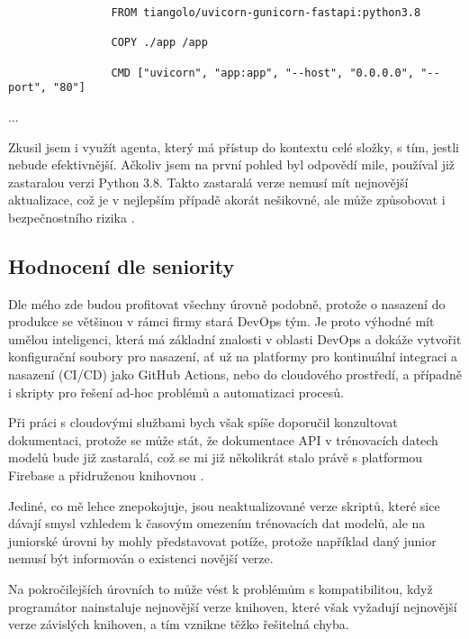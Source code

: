 \documentclass[FM,DP]{tulthesis}
\begin{document}
		\vspace{0.6em}
		\begin{tcolorbox}[colback=white,colframe=black,title=Soubor pro spuštení docker kontejneru]
			\begin{lstlisting}
				FROM tiangolo/uvicorn-gunicorn-fastapi:python3.8
				
				COPY ./app /app
				
				CMD ["uvicorn", "app:app", "--host", "0.0.0.0", "--port", "80"]
			\end{lstlisting}
			... \cite{agent_deploy}
		\end{tcolorbox}
		\vspace{0.6em}
		
		Zkusil jsem i využít agenta, který má přístup do kontextu celé složky, s tím, jestli nebude efektivnější. Ačkoliv jsem na první pohled byl odpovědí mile, používal již zastaralou verzi Python 3.8. Takto zastaralá verze nemusí mít nejnovější aktualizace, což je v nejlepším případě akorát nešikovné, ale může způsobovat i bezpečnostního rizika \cite{agent_deploy}.
		
		\subsection{Hodnocení dle seniority}
		Dle mého zde budou profitovat všechny úrovně podobně, protože o nasazení do produkce se většinou v rámci firmy stará DevOps tým. Je proto výhodné mít umělou inteligenci, která má základní znalosti v oblasti DevOps a dokáže vytvořit konfigurační soubory pro nasazení, ať už na platformy pro kontinuální integraci a nasazení (CI/CD) jako GitHub Actions, nebo do cloudového prostředí, a případně i skripty pro řešení ad-hoc problémů a automatizaci procesů. 
		
		Při práci s cloudovými službami bych však spíše doporučil konzultovat dokumentaci, protože se může stát, že dokumentace API v trénovacích datech modelů bude již zastaralá, což se mi již několikrát stalo právě s platformou Firebase a přidruženou knihovnou \cite{firebase} \cite{cicd} \cite{cicd2}.
		
		Jediné, co mě lehce znepokojuje, jsou neaktualizované verze skriptů, které sice dávají smysl vzhledem k časovým omezením trénovacích dat modelů, ale na juniorské úrovni by mohly představovat potíže, protože například daný junior nemusí být informován o existenci novější verze. 
		
		Na pokročilejších úrovních to může vést k problémům s kompatibilitou, když programátor nainstaluje nejnovější verze knihoven, které však vyžadují nejnovější verze závislých knihoven, a tím vznikne těžko řešitelná chyba. 
		
\end{document}
